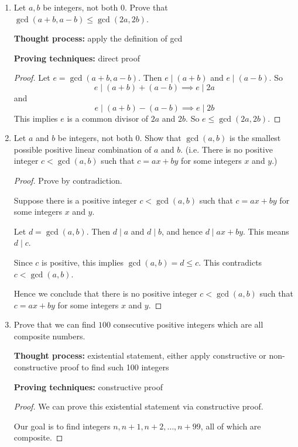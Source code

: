 \documentclass[12pt,a4 paper]{article}
\begin{document}
\begin{enumerate}
\begin{proof}
In all cases, we have $3\nmid ab$.
\end{proof}

\item Let $a,b$ be integers, not both $0$. Prove that $\gcd(a+b,a-b)\le\gcd(2a,2b)$.

\textbf{Thought process:} apply the definition of gcd

\textbf{Proving techniques:} direct proof

\begin{proof}
Let $e=\gcd(a+b,a-b)$. Then $e\mid(a+b)$ and $e\mid(a-b)$. So
\[ e\mid(a+b)+(a-b) \implies e\mid 2a \]
and
\[ e\mid(a+b)-(a-b) \implies e\mid 2b \]
This implies $e$ is a common divisor of $2a$ and $2b$. So $e\le\gcd(2a,2b)$.
\end{proof}

\item Let $a$ and $b$ be integers, not both $0$. Show that $\gcd(a,b)$ is the smallest possible positive linear combination of $a$ and $b$. (i.e. There is no positive integer $c<\gcd(a,b)$ such that $c=ax+by$ for some integers $x$ and $y$.)

\begin{proof}
Prove by contradiction.

Suppose there is a positive integer $c<\gcd(a,b)$ such that $c=ax+by$ for some integers $x$ and $y$.

Let $d=\gcd(a,b)$. Then $d\mid a$ and $d\mid b$, and hence $d\mid ax+by$. This means $d\mid c$.

Since $c$ is positive, this implies $\gcd(a,b)=d\le c$. This contradicts $c<\gcd(a,b)$.

Hence we conclude that there is no positive integer $c<\gcd(a,b)$ such that $c=ax+by$ for some integers $x$ and $y$.
\end{proof}

\item Prove that we can find $100$ consecutive positive integers which are all composite numbers.

\textbf{Thought process:} existential statement, either apply constructive or non-constructive proof to find such 100 integers

\textbf{Proving techniques:} constructive proof

\begin{proof}
We can prove this existential statement via constructive proof.

Our goal is to find integers $n,n+1,n+2,\dots,n+99$, all of which are composite.


\end{proof}
\end{enumerate}
\end{document}
